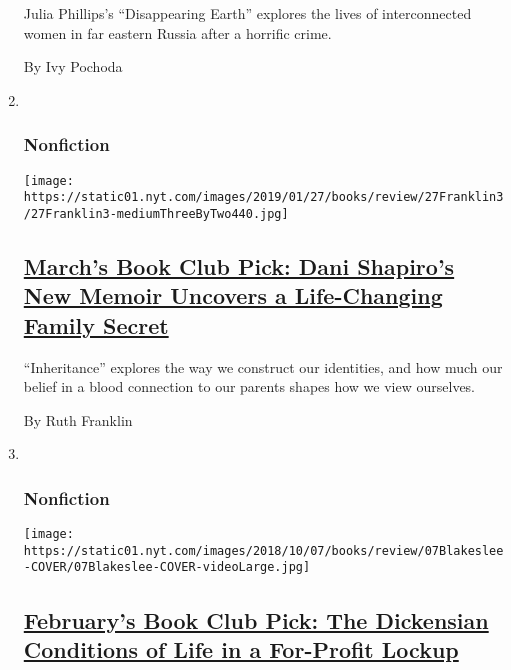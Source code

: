 \begin{enumerate}
  Julia Phillips's ``Disappearing Earth'' explores the lives of
  interconnected women in far eastern Russia after a horrific crime.

  By Ivy Pochoda
\item ~
  \hypertarget{nonfiction}{%
  \subsubsection{Nonfiction}\label{nonfiction}}

  \texttt{[image: https://static01.nyt.com/images/2019/01/27/books/review/27Franklin3/27Franklin3-mediumThreeByTwo440.jpg]}

  \hypertarget{marchs-book-club-pick-dani-shapiros-new-memoir-uncovers-a-life-changing-family-secret}{%
  \subsection{\texorpdfstring{\href{/2019/01/15/books/review/dani-shapiro-inheritance.html}{March's
  Book Club Pick: Dani Shapiro's New Memoir Uncovers a Life-Changing
  Family
  Secret}}{March's Book Club Pick: Dani Shapiro's New Memoir Uncovers a Life-Changing Family Secret}}\label{marchs-book-club-pick-dani-shapiros-new-memoir-uncovers-a-life-changing-family-secret}}

  ``Inheritance'' explores the way we construct our identities, and how
  much our belief in a blood connection to our parents shapes how we
  view ourselves.

  By Ruth Franklin
\item ~
  \hypertarget{nonfiction-1}{%
  \subsubsection{Nonfiction}\label{nonfiction-1}}

  \texttt{[image: https://static01.nyt.com/images/2018/10/07/books/review/07Blakeslee-COVER/07Blakeslee-COVER-videoLarge.jpg]}

  \hypertarget{februarys-book-club-pick-the-dickensian-conditions-of-life-in-a-for-profit-lockup}{%
  \subsection{\texorpdfstring{\href{/2018/10/01/books/review/shane-bauer-american-prison.html}{February's
  Book Club Pick: The Dickensian Conditions of Life in a For-Profit
  Lockup}}{February's Book Club Pick: The Dickensian Conditions of Life in a For-Profit Lockup}}\label{februarys-book-club-pick-the-dickensian-conditions-of-life-in-a-for-profit-lockup}}


\end{enumerate}
